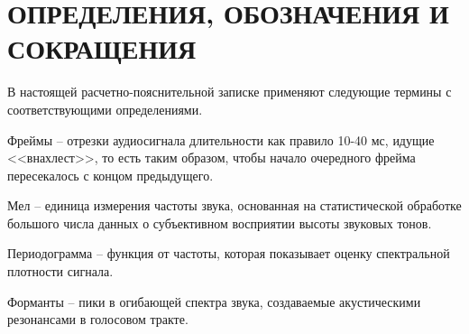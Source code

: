 \part*{ОПРЕДЕЛЕНИЯ, ОБОЗНАЧЕНИЯ И\\СОКРАЩЕНИЯ}

В настоящей расчетно-пояснительной записке применяют следующие термины с соответствующими определениями.

\begin{enumdescript}
	\item[Фреймы] -- отрезки аудиосигнала длительности как правило 10-40 мс, идущие <<внахлест>>, то есть таким
	образом, чтобы начало очередного фрейма пересекалось с концом предыдущего. 
	\item[Мел] -- единица измерения частоты звука, основанная на статистической обработке большого числа данных о субъективном восприятии высоты звуковых тонов.
	\item[Периодограмма] -- функция от частоты, которая показывает оценку спектральной плотности сигнала.
	\item[Форманты] --  пики в огибающей спектра звука, создаваемые акустическими резонансами в голосовом тракте. 
\end{enumdescript}

